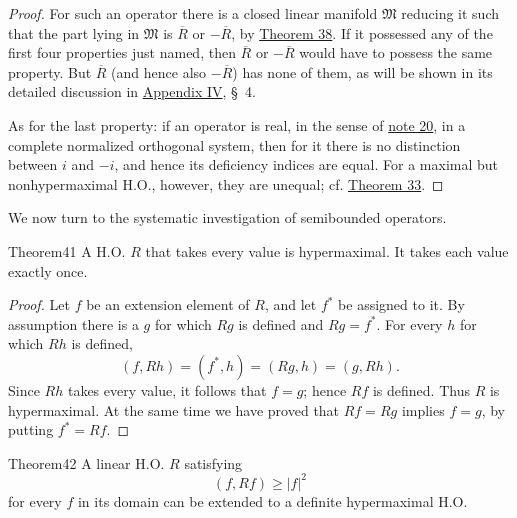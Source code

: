 ﻿\documentclass[paper=b5,fontsize=13pt,bookmarkpackage=false,twoside]{scrartcl}
\begin{document}
\begin{proof}
For such an operator there is a closed linear manifold $\mathfrak M$ reducing it such that the part lying in $\mathfrak M$ is $\overline R$ or $-\overline R$, by \hyperref[thm:38]{Theorem 38}. If it possessed any of the first four properties just named, then $\overline R$ or $-\overline R$ would have to possess the same property. But $\overline R$ (and hence also $-\overline R$) has none of them, as will be shown in its detailed discussion in \hyperref[app:IV]{Appendix IV}, \S~4.

As for the last property: if an operator is real, in the sense of \hyperref[fn:source-20]{note 20}, in a complete normalized orthogonal system, then for it there is no distinction between $i$ and $-i$, and hence its deficiency indices are equal. For a maximal but nonhypermaximal H.O., however, they are unequal; cf. \hyperref[thm:33]{Theorem 33}.
\end{proof}

We now turn to the systematic investigation of semibounded operators.

\begin{namedstatement}{Theorem}{41}\label{thm:41}
A H.O. $R$ that takes every value is hypermaximal. It takes each value exactly once.
\end{namedstatement}

\begin{proof}
Let $f$ be an extension element of $R$, and let $f^*$ be assigned to it. By assumption there is a $g$ for which $Rg$ is defined and $Rg=f^*$. For every $h$ for which $Rh$ is defined,
\[
(f,Rh)=(f^*,h)=(Rg,h)=(g,Rh).
\]
Since $Rh$ takes every value, it follows that $f=g$; hence $Rf$ is defined. Thus $R$ is hypermaximal. At the same time we have proved that $Rf=Rg$ implies $f=g$, by putting $f^*=Rf$.
\end{proof}

\begin{namedstatement}{Theorem}{42}\label{thm:42}
A linear H.O. $R$ satisfying
\[
(f,Rf)\ge |f|^2
\]
for every $f$ in its domain can be extended to a definite hypermaximal H.O.
\end{namedstatement}
\end{document}
